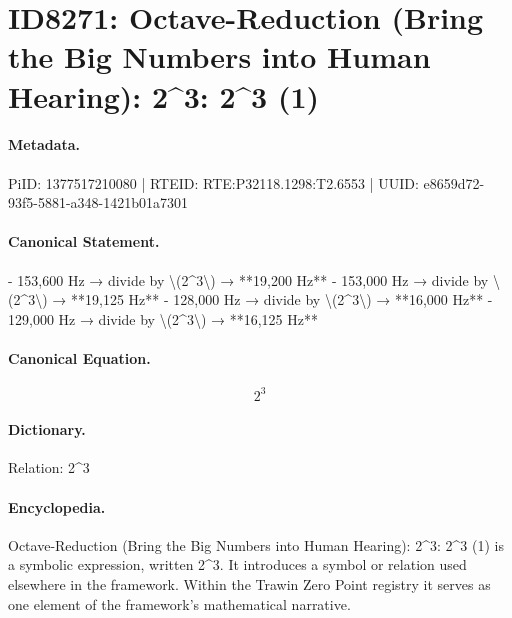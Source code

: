 \section*{ID8271: Octave-Reduction (Bring the Big Numbers into Human Hearing): 2\textasciicircum{}3: 2\textasciicircum{}3 (1)}
\paragraph{Metadata.}
PiID: 1377517210080 | RTEID: RTE:P32118.1298:T2.6553 | UUID: e8659d72-93f5-5881-a348-1421b01a7301

\paragraph{Canonical Statement.}
- 153,600 Hz → divide by \textbackslash{}(2\textasciicircum{}3\textbackslash{}) → **19,200 Hz** - 153,000 Hz → divide by \textbackslash{}(2\textasciicircum{}3\textbackslash{}) → **19,125 Hz** - 128,000 Hz → divide by \textbackslash{}(2\textasciicircum{}3\textbackslash{}) → **16,000 Hz** - 129,000 Hz → divide by \textbackslash{}(2\textasciicircum{}3\textbackslash{}) → **16,125 Hz**

\paragraph{Canonical Equation.}
\[
2^3
\]

\paragraph{Dictionary.}
Relation: 2\textasciicircum{}3

\paragraph{Encyclopedia.}
Octave-Reduction (Bring the Big Numbers into Human Hearing): 2\textasciicircum{}3: 2\textasciicircum{}3 (1) is a symbolic expression, written 2\textasciicircum{}3. It introduces a symbol or relation used elsewhere in the framework. Within the Trawin Zero Point registry it serves as one element of the framework's mathematical narrative.
